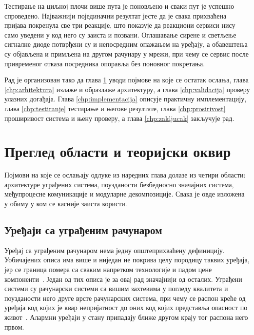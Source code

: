\documentclass[12pt,oneside]{memoir}
\begin{document}
Тестирање на циљној плочи више пута је поновљено и сваки пут је успешно спроведено. Најважнији појединачни
резултат јесте да је свака прихваћена пријава покренула све три реакције, што показује да
реакциони сервиси нису само уведени у код него су заиста и позвани. Оглашавање сирене и
светљење сигналне диоде потврђени су и непосредним опажањем на уређају, а обавештења су
објављена и примљена на другом рачунару у мрежи, при чему се сервис после привременог отказа
посредника опоравља без поновног покретања.

Рад је организован тако да глава \ref{chp:pregled} уводи појмове на које се остатак ослања,
глава \ref{chp:arhitektura} излаже и образлаже архитектуру, а глава \ref{chp:validacija}
проверу улазних догађаја. Глава \ref{chp:implementacija} описује практичну имплементацију, глава
\ref{chp:testiranje} тестирање и његове резултате, глава \ref{chp:prosirivost}
проширивост система и њену проверу, а глава \ref{chp:zakljucak} закључује рад.

\chapter{Преглед области и теоријски оквир}
\label{chp:pregled}
Појмови на које се ослањају одлуке из наредних глава долазе из четири области: архитектуре
уграђених система, поузданости безбедносно значајних система, међупроцесне комуникације и
модуларне декомпозиције. Свака је овде изложена у обиму у ком се касније заиста користи.

\section{Уређаји са уграђеним рачунаром}
\label{sec:embedded}

Уређај са уграђеним рачунаром нема једну општеприхваћену
дефиницију. Уобичајених описа има више и ниједан не покрива целу породицу таквих уређаја, јер
се граница помера са сваким напретком технологије и падом цене
компоненти~\cite{Noergaard2005}. Један од тих описа је за овај рад значајнији од
осталих. Уграђени системи су рачунарски системи са вишим захтевима у погледу квалитета и
поузданости него друге врсте рачунарских система, при чему се распон креће од уређаја код
којих је квар непријатност до оних код којих представља опасност по
живот~\cite{Noergaard2005}. Алармни уређаји у стану припадају ближе другом крају тог
распона него првом.
\end{document}
